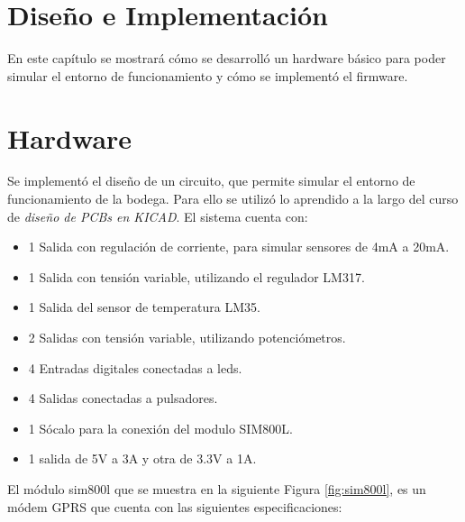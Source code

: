 \section{Diseño e Implementación}
En este capítulo se mostrará cómo se desarrolló un hardware básico para poder simular el entorno de funcionamiento y cómo se implementó el firmware.

\section{Hardware}

Se implementó el diseño de un circuito, que permite simular el entorno de funcionamiento de la bodega. Para ello se utilizó lo aprendido a la largo del curso de \emph{diseño de PCBs en KICAD}. El sistema cuenta con:
\begin{itemize}
  \item 1 Salida con regulación de corriente, para simular sensores de 4mA a 20mA.
  \item 1 Salida con tensión variable, utilizando el regulador LM317.
  \item 1 Salida del sensor de temperatura LM35.
  \item 2 Salidas con tensión variable, utilizando potenciómetros. 
  \item 4 Entradas digitales conectadas a leds.
  \item 4 Salidas conectadas a pulsadores. 
  \item 1 Sócalo para la conexión del modulo SIM800L. 
  \item 1 salida de 5V a 3A y otra de 3.3V a 1A. 
\end{itemize}

El módulo sim800l que se muestra en la siguiente Figura \ref{fig:sim800l}, es un módem GPRS que cuenta con las siguientes especificaciones:


